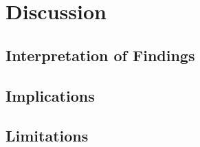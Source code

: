 \chapter{Discussion}
\label{chap:discussion}


\section{Interpretation of Findings}
\label{sec:interpretation}


\section{Implications}
\label{sec:implications}


\section{Limitations}
\label{sec:limitations}
